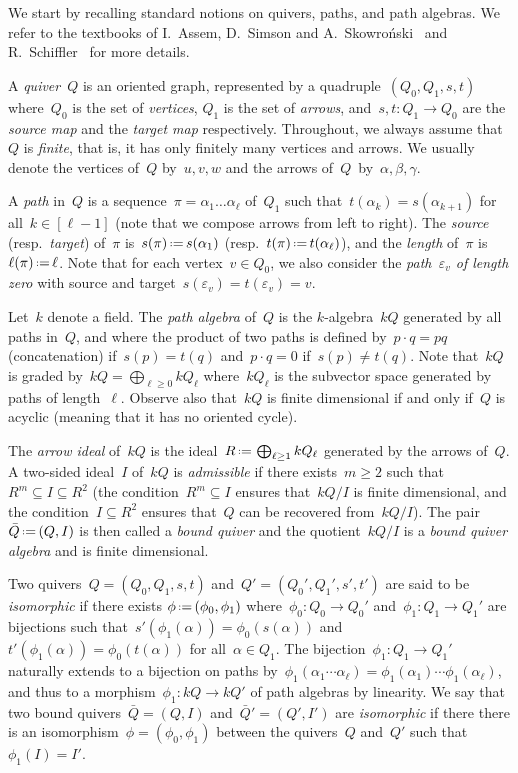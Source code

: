 \documentclass{amsart}
\theoremstyle{definition}
\newcommand{\eqdef}{\mbox{\,\raisebox{0.2ex}{\scriptsize\ensuremath{\mathrm:}}\ensuremath{=}\,}} %
\newcommand{\darkblue}{\color{darkblue}} %
\newcommand{\defn}[1]{\textsl{\darkblue #1}} %
\begin{document}
We start by recalling standard notions on quivers, paths, and path algebras.
We refer to the textbooks of I.~Assem, D.~Simson and A.~Skowro\'nski~\cite{AssemSimsonSkowronski} and R.~Schiffler~\cite{Schiffler} for more details.

A \defn{quiver}~$Q$ is an oriented graph, represented by a quadruple~$(Q_0, Q_1, s, t)$ where~$Q_0$ is the set of \defn{vertices}, $Q_1$ is the set of \defn{arrows}, and~$s, t : Q_1 \to Q_0$ are the \defn{source map} and the \defn{target map} respectively.
Throughout, we always assume that~$Q$ is \defn{finite}, that is, it has only finitely many vertices and arrows.
We usually denote the vertices of~$Q$ by~$u,v,w$ and the arrows of~$Q$~by~$\alpha, \beta, \gamma$.

A \defn{path} in~$Q$ is a sequence~$\pi = \alpha_1 \dots \alpha_\ell$ of~$Q_1$ such that~$t(\alpha_k) = s(\alpha_{k+1})$ for all~${k \in [\ell-1]}$ (note that we compose arrows from left to right).
The \defn{source} (resp.~\defn{target}) of~$\pi$ is~$s(\pi) \eqdef s(\alpha_1)$ (resp.~$t(\pi) \eqdef t(\alpha_\ell)$), and the \defn{length} of~$\pi$ is~$\ell(\pi) \eqdef \ell$.
Note that for each vertex~$v \in Q_0$, we also consider the \defn{path~$\varepsilon_v$ of length zero} with source and target~$s(\varepsilon_v) = t(\varepsilon_v) = v$.

Let~$k$ denote a field.
The \defn{path algebra} of~$Q$ is the $k$-algebra~$kQ$ generated by all paths in~$Q$, and where the product of two paths is defined by~$p \cdot q = pq$ (concatenation) if~$s(p) = t(q)$ and~$p \cdot q = 0$ if~$s(p) \ne t(q)$.
Note that~$kQ$ is graded by~$kQ = \bigoplus_{\ell \ge 0} kQ_\ell$ where~$kQ_\ell$ is the subvector space generated by paths of length~$\ell$.
Observe also that~$kQ$ is finite dimensional if and only if~$Q$ is acyclic (meaning that it has no oriented cycle).

The \defn{arrow ideal} of~$kQ$ is the ideal~$R \eqdef \bigoplus_{\ell \ge 1} kQ_\ell$ generated by the arrows of~$Q$.
A two-sided ideal~$I$ of~$kQ$ is \defn{admissible} if there exists~$m \ge 2$ such that~$R^m \subseteq I \subseteq R^2$ (the condition~$R^m \subseteq I$ ensures that~$kQ/I$ is finite dimensional, and the condition~$I \subseteq R^2$ ensures that~$Q$ can be recovered from~$kQ/I$).
The pair~$\bar Q \eqdef (Q,I)$ is then called a \defn{bound quiver} and the quotient~$kQ/I$ is a \defn{bound quiver algebra} and is finite dimensional.

Two quivers~$Q = (Q_0, Q_1, s, t)$ and~$Q' = (Q_0', Q_1', s', t')$ are said to be \defn{isomorphic} if there exists $\phi \eqdef (\phi_0, \phi_1)$ where~$\phi_0 : Q_0 \to Q_0'$ and~$\phi_1 : Q_1 \to Q_1'$ are bijections such that~${s'(\phi_1(\alpha)) = \phi_0(s(\alpha))}$ and~${t'(\phi_1(\alpha)) = \phi_0(t(\alpha))}$ for all~$\alpha \in Q_1$.
The bijection~$\phi_1 : Q_1 \to Q_1'$ naturally extends to a bijection on paths by~$\phi_1(\alpha_1 \cdots \alpha_\ell) = \phi_1(\alpha_1) \cdots \phi_1(\alpha_\ell)$, and thus to a morphism~$\phi_1 : kQ \to kQ'$ of path algebras by linearity.
We say that two bound quivers~$\bar Q = (Q,I)$ and~$\bar Q' = (Q',I')$ are \defn{isomorphic} if there there is an isomorphism~$\phi = (\phi_0, \phi_1)$ between the quivers~$Q$ and~$Q'$ such that~$\phi_1(I) = I'$.
\end{document}
